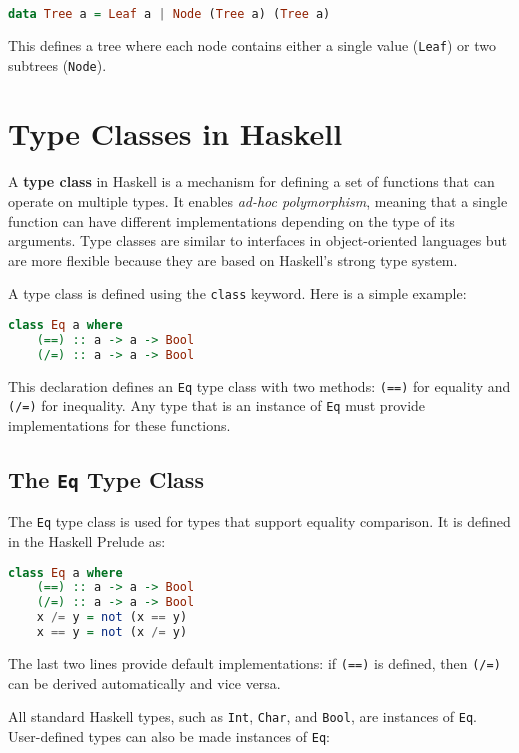 \begin{lstlisting}[style=haskellstyle, language=Haskell]
data Tree a = Leaf a | Node (Tree a) (Tree a)
\end{lstlisting}
This defines a tree where each node contains either a single value (\texttt{Leaf}) or two subtrees
(\texttt{Node}). 

\section{Type Classes in Haskell}
A \textbf{type class} in Haskell is a mechanism for defining a set of functions that can operate on multiple
types. It enables \textit{ad-hoc polymorphism}, meaning that a single function can have different
implementations depending on the type of its arguments. Type classes are similar to interfaces in
object-oriented languages but are more flexible because they are based on Haskell’s strong type system. 

A type class is defined using the \texttt{class} keyword. Here is a simple example:

\begin{lstlisting}[style=haskellstyle, language=Haskell]
class Eq a where
    (==) :: a -> a -> Bool
    (/=) :: a -> a -> Bool
\end{lstlisting}

This declaration defines an \texttt{Eq} type class with two methods: \texttt{(==)} for equality and \texttt{(/=)} for inequality. Any type that is an instance of \texttt{Eq} must provide implementations for these functions.

\subsection{The \texttt{Eq} Type Class}
The \texttt{Eq} type class is used for types that support equality comparison. It is defined in the Haskell Prelude as:

\begin{lstlisting}[style=haskellstyle, language=Haskell]
class Eq a where
    (==) :: a -> a -> Bool
    (/=) :: a -> a -> Bool
    x /= y = not (x == y)
    x == y = not (x /= y)
\end{lstlisting}

The last two lines provide default implementations: if \texttt{(==)} is defined, then \texttt{(/=)} can be
derived automatically and vice versa. 

All standard Haskell types, such as \texttt{Int}, \texttt{Char}, and \texttt{Bool}, are instances of
\texttt{Eq}. User-defined types can also be made instances of \texttt{Eq}: 

